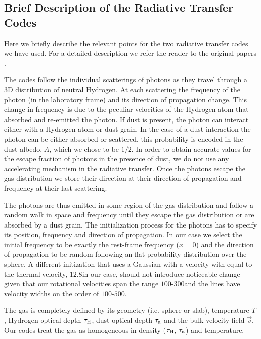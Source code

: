 \documentclass{emulateapj}
\newcommand{\ly}{{\ifmmode{{\rm Ly}\alpha~}\else{Ly$\alpha$~}\fi}}
\newcommand{\kms}{{\ifmmode{{\mathrm{\,km\ s}^{-1}}}\else{\,km~s$^{-1}$}\fi}}
\begin{document}
\subsection{Brief Description of the Radiative Transfer Codes}

Here we briefly describe the relevant points for the two radiative
transfer codes we have used. For a detailed description we refer the
reader to the original papers \cite{CLARA,DijkstraKramer}.

The codes follow the individual scatterings of \ly photons as they
travel through a 3D distribution of neutral Hydrogen. At each
scattering the frequency of the photon (in the laboratory frame) and
its direction of propagation change. This change in frequency is due
to the peculiar velocities of the Hydrogen atom that absorbed and
re-emitted the photon. If dust is present, the photon can interact
either with a Hydrogen atom or dust grain. In the case of a dust
interaction the photon can be either absorbed or scattered, this
probability is encoded in the dust albedo, $A$, which we chose to be
$1/2$. In order to obtain accurate values for the escape fraction of
photons in the presence of dust, we do not use any accelerating
mechanism in the radiative transfer. Once the photons escape the gas
distribution we store their direction at their direction of
propagation and frequency at their last scattering.

The photons are thus emitted in some region of the gas distribution
and follow a random walk in space and frequency until they escape the
gas distribution or are absorbed by a dust grain. The initialization
process for the \ly photons has to specify its position, frequency and
direction of propagation. In our case we select the initial frequency
to be exactly the \ly rest-frame frequency ($x=0$) and the direction of
propagation to be random following an flat probability distribution
over the sphere. A different initization that uses a Gaussian with a
velocity with equal to the thermal velocity, $12.8$\kms in our case,
should not introduce noticeable change given that our rotational
velocities span the range $100$-$300$\kms and the lines have velocity
widths on the order of $100$-$500$\kms.

The gas is completely defined by its geometry (i.e. sphere or slab),
temperature $T$, Hydrogen optical depth $\tau_{\rm H}$, dust optical
depth $\tau_{\rm a}$ and the bulk velocity field $\vec{v}$. Our codes
treat the gas as homogeneous in density ($\tau_{\rm H}$, $\tau_{\rm
  a}$) and temperature.  
\end{document}
